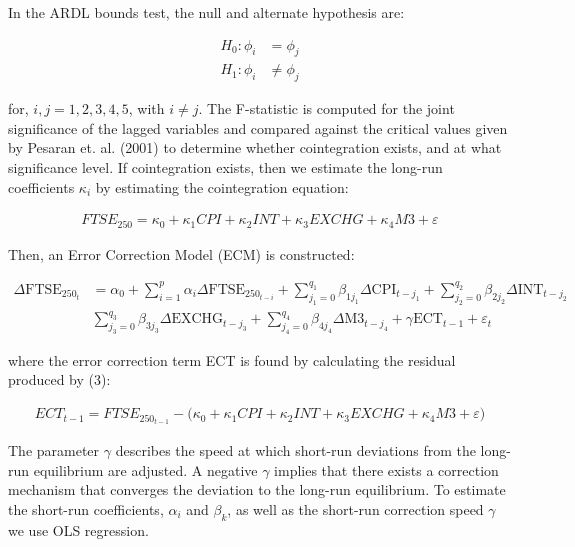 \documentclass[12pt,a4paper]{article}
\begin{document}
In the ARDL bounds test, the null and alternate hypothesis are:
 
\begin{align*}
    H_{0}: \phi_i &= \phi_j\\
    H_{1}: \phi_i &\neq \phi_j
\end{align*}

for, $i,j = 1,2,3,4,5$, with $i\neq j$. The F-statistic is computed for the joint
significance of the lagged variables and compared against the critical values
given by Pesaran et. al. (2001) to determine whether cointegration exists, 
and at what significance level. If cointegration exists, then we estimate 
the long-run coefficients $\kappa_i$ by estimating the cointegration equation:

\begin{align}
    FTSE_{250} = \kappa_0 + \kappa_1 CPI + \kappa_2 INT + \kappa_3 EXCHG + \kappa_4 M3 + \varepsilon 
\end{align}

Then, an Error Correction Model (ECM) is constructed:

\begin{align*}
    \Delta \text{FTSE}_{250_t} &= \alpha_0 + \sum_{i=1}^{p} \alpha_i \Delta \text{FTSE}_{250_{t-i}} + \sum_{j_{1}=0}^{q_1} \beta_{1j_{1}} \Delta \text{CPI}_{t-j_{1}} + \sum_{j_{2}=0}^{q_2} \beta_{2j_{2}} \Delta \text{INT}_{t-j_{2}} \\
                               & \sum_{j_{3}=0}^{q_3} \beta_{3j_{3}} \Delta \text{EXCHG}_{t-j_{3}} + \sum_{j_{4}=0}^{q_4} \beta_{4j_{4}} \Delta \text{M3}_{t-j_{4}} + \gamma\text{ECT}_{t-1} + \varepsilon_t
\end{align*}

where the error correction term ECT is found by calculating the residual 
produced by (3):

\begin{align*}
    ECT_{t-1} = FTSE_{250_{t-1}} - \biggl(\kappa_0 + \kappa_1 CPI + \kappa_2 INT + \kappa_3 EXCHG + \kappa_4 M3 + \varepsilon \biggr)
\end{align*}

The parameter $\gamma$ describes the speed at which short-run deviations from the long-run equilibrium
are adjusted. A negative $\gamma$ implies that there exists a correction mechanism that converges the deviation 
to the long-run equilibrium. To estimate the short-run coefficients, $\alpha_i$ and $\beta_k$, as 
well as the short-run correction speed $\gamma$ we use OLS regression.
\end{document}

